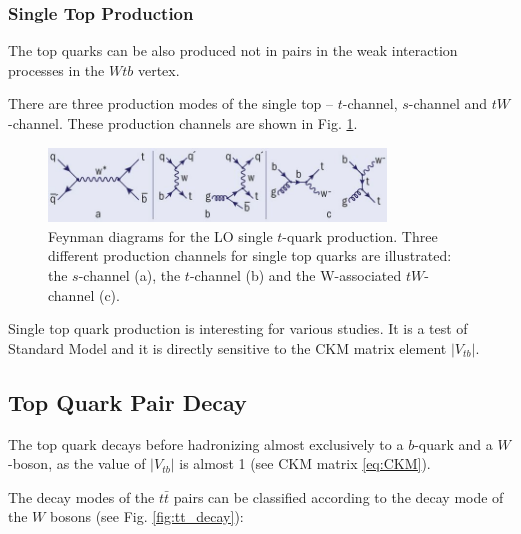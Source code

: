 \subsubsection{Single Top Production}

The top quarks can be also produced not in pairs in the weak interaction processes in the $Wtb$ vertex.

There are three production modes of the single top -- $t$-channel, $s$-channel and $tW$-channel. These production channels are shown in Fig. \ref{fig:single_t_prod}.

\begin{figure}[h]
  \centering
  \includegraphics[width=0.8\textwidth]{01_Theory_SM/plots/single_top.png}
  \caption{Feynman diagrams for the LO single $t$-quark production. Three different production channels for single top quarks are illustrated: 
  the $s$-channel (a), the $t$-channel (b) and the W-associated $tW$-channel (c).}
  \label{fig:single_t_prod}
\end{figure}

Single top quark production is interesting for various studies. It is a test of Standard Model and it is directly sensitive to the CKM matrix
element $|V_{tb}|$.

\subsection{Top Quark Pair Decay}\label{ssec:tdecay}

The top quark decays before hadronizing almost exclusively to a $b$-quark and a $W$-boson, as the value of $|V_{tb}|$ is almost 1 (see CKM matrix \ref{eq:CKM}).

The decay modes of the $t\bar{t}$ pairs can be classified according to the decay mode of the $W$ bosons (see Fig. \ref{fig:tt_decay}):

